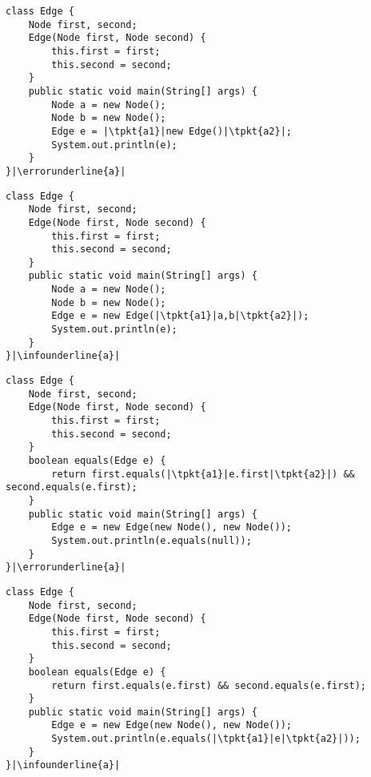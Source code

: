 \newsavebox{\edgetypeerror}
\begin{lrbox}{\edgetypeerror}
	\begin{lstlisting}
class Edge {
	Node first, second;
	Edge(Node first, Node second) {
		this.first = first;
		this.second = second;
	}
	public static void main(String[] args) {
		Node a = new Node();
		Node b = new Node();
		Edge e = |\tpkt{a1}|new Edge()|\tpkt{a2}|;
		System.out.println(e);
	}
}|\errorunderline{a}|
\end{lstlisting}
\end{lrbox}

\newsavebox{\edgetypeerrorfix}
\begin{lrbox}{\edgetypeerrorfix}
\begin{lstlisting}
class Edge {
	Node first, second;
	Edge(Node first, Node second) {
		this.first = first;
		this.second = second;
	}
	public static void main(String[] args) {
		Node a = new Node();
		Node b = new Node();
		Edge e = new Edge(|\tpkt{a1}|a,b|\tpkt{a2}|);
		System.out.println(e);
	}
}|\infounderline{a}|
\end{lstlisting}
\end{lrbox}

\newsavebox{\edgeruntimeerror}
\begin{lrbox}{\edgeruntimeerror}
	\begin{lstlisting}
class Edge {
	Node first, second;
	Edge(Node first, Node second) {
		this.first = first;
		this.second = second;
	}
	boolean equals(Edge e) {
		return first.equals(|\tpkt{a1}|e.first|\tpkt{a2}|) && second.equals(e.first);
	}
	public static void main(String[] args) {
		Edge e = new Edge(new Node(), new Node());
		System.out.println(e.equals(null));
	}
}|\errorunderline{a}|
	\end{lstlisting}
\end{lrbox}

\newsavebox{\edgeruntimeerrorfix}
\begin{lrbox}{\edgeruntimeerrorfix}
	\begin{lstlisting}
class Edge {
	Node first, second;
	Edge(Node first, Node second) {
		this.first = first;
		this.second = second;
	}
	boolean equals(Edge e) {
		return first.equals(e.first) && second.equals(e.first);
	}
	public static void main(String[] args) {
		Edge e = new Edge(new Node(), new Node());
		System.out.println(e.equals(|\tpkt{a1}|e|\tpkt{a2}|));
	}
}|\infounderline{a}|
	\end{lstlisting}
\end{lrbox}

